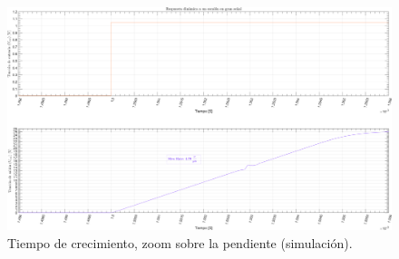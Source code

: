 \clearpage

\begin{figure}[H]
    \centering
    \includegraphics[angle=90,scale=0.45]{./img/simulaciones/Slew_Rate/amplifier_SR_zoom.png}
    \caption{Tiempo de crecimiento, zoom sobre la pendiente  (simulación).}
    \label{fig:Slew_Rate_zoom}
\end{figure}

\clearpage